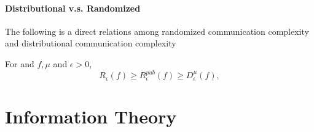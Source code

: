 \paragraph{Distributional v.s. Randomized}
The following is a direct relations among randomized communication complexity and distributional communication complexity
\begin{theorem}
For and $f, \mu$ and $\epsilon > 0$,
\begin{equation*}
	R_{\epsilon}(f)\geq R^{pub}_{\epsilon}(f)\geq D^{\mu}_{\epsilon}(f),
\end{equation*}
\end{theorem}


\section{Information Theory}